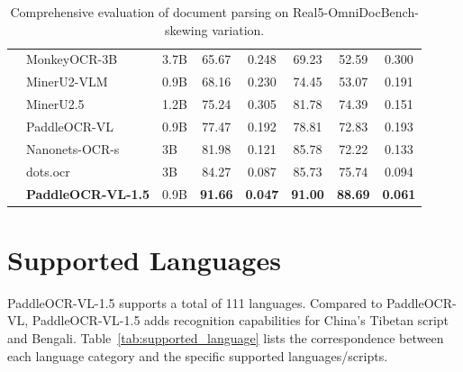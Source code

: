 \documentclass[11pt, a4paper,logo,  copyright, nonumbering]{paddleocr}
\begin{document}
\begin{table}[H]
{\begin{tabular}{l|ll|c|c c c c}
        & MonkeyOCR-3B ~\cite{li2025monkeyocr}& 3.7B & 65.67 & 0.248 & 69.23 & 52.59 & 0.300 \\
         & MinerU2-VLM~\cite{MinerU2} & 0.9B & 68.16 & 0.230 & 74.45 & 53.07 & 0.191 \\
         & MinerU2.5~\cite{niu2025mineru2} & 1.2B & 75.24 & 0.305 & 81.78 & 74.39 & 0.151 \\
         & PaddleOCR-VL ~\cite{cui2025paddleocrvl}& 0.9B & 77.47 & 0.192 & 78.81 & 72.83 & 0.193 \\
         & Nanonets-OCR-s~\cite{Nanonets-OCR-S} & 3B & 81.98 & 0.121 & 85.78 & 72.22 & 0.133 \\
         & dots.ocr~\cite{dotsocr} & 3B & 84.27 & 0.087 & 85.73 & 75.74 & 0.094 \\
         & \textbf{PaddleOCR-VL-1.5} & 0.9B & \cellcolor{red!15}\textbf{91.66} & \cellcolor{red!15}\textbf{0.047} & \cellcolor{red!15}\textbf{91.00} & \cellcolor{red!15}\textbf{88.69} & \cellcolor{red!15}\textbf{0.061} \\
        \bottomrule
    \end{tabular}%
    }
    \caption{Comprehensive evaluation of document parsing on Real5-OmniDocBench-skewing variation.}
    \label{tab:ocr_performance_skew}
\end{table}

\clearpage 
\newpage


\section{Supported Languages}

PaddleOCR-VL-1.5 supports a total of 111 languages. Compared to PaddleOCR-VL, PaddleOCR-VL-1.5 adds recognition capabilities for China's Tibetan script and Bengali. Table~\ref{tab:supported_language} lists the correspondence between each language category and the specific supported languages/scripts.
\end{document}
